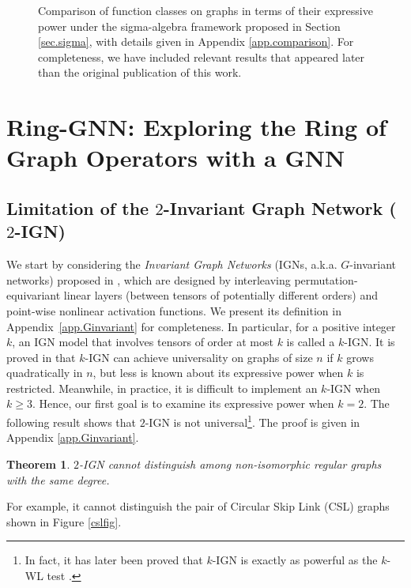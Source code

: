 \documentclass{article}
\newtheorem{theorem}{Theorem}
\begin{document}
\begin{figure}[ht]
\label{diagram_main_text}
\small
\centering
{}
\caption{\small Comparison of function classes on graphs in terms of their expressive power under the sigma-algebra framework proposed in Section \ref{sec.sigma}, with details given in Appendix \ref{app.comparison}. For completeness, we have included relevant results that appeared later than the original publication of this work.}
\label{fig.diagram}
\end{figure}

\section{Ring-GNN: Exploring the Ring of Graph Operators with a GNN}
\subsection{Limitation of the $2$-Invariant Graph Network ($2$-IGN)}
We start by considering the \emph{Invariant Graph Networks} (IGNs, a.k.a. $G$-invariant networks) proposed in \cite{maron2019universality}, which are designed by interleaving permutation-equivariant linear layers (between tensors of potentially different orders) and point-wise nonlinear activation functions.
We present its definition in Appendix~\ref{app.Ginvariant} for completeness. In particular, for a positive integer $k$, an IGN model that involves tensors of order at most $k$ is called a $k$-IGN.
It is proved in \cite{maron2019universality} that $k$-IGN can achieve universality on graphs of size $n$ if $k$ grows quadratically in $n$, but less is known about its expressive power when $k$ is restricted. Meanwhile, in practice, it is difficult to implement an $k$-IGN when $k \geq 3$. Hence, our first goal is to examine its expressive power when $k = 2$.
The following result shows that $2$-IGN is not universal\footnote{In fact, it has later been proved that $k$-IGN is exactly as powerful as the $k$-WL test \cite{chen2020can, geerts2020expressive, geerts2022expressiveness}.}. The proof is given in Appendix \ref{app.Ginvariant}. 
\begin{theorem} \label{prop.Ginvariant}
$2$-IGN cannot distinguish among non-isomorphic regular graphs with the same degree.
\end{theorem}
For example, it cannot distinguish the pair of Circular Skip Link (CSL) graphs shown in Figure \ref{cslfig}.
\end{document}
